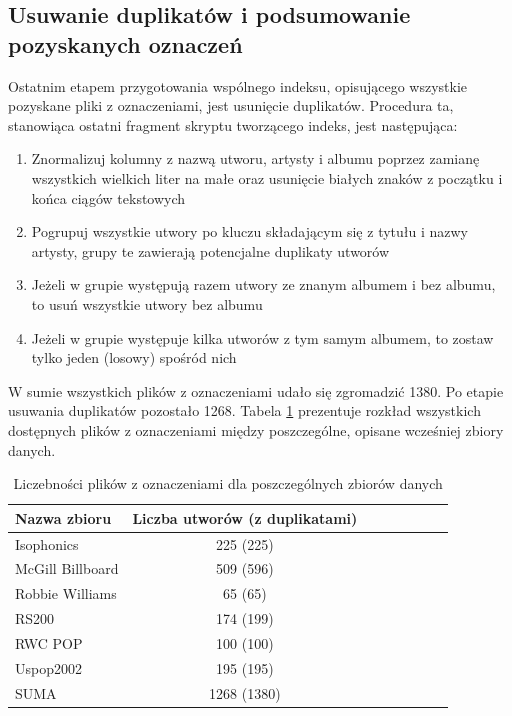\subsection{Usuwanie duplikatów i podsumowanie pozyskanych oznaczeń}

Ostatnim etapem przygotowania wspólnego indeksu, opisującego wszystkie pozyskane pliki z
oznaczeniami, jest usunięcie duplikatów. Procedura ta, stanowiąca ostatni fragment skryptu
tworzącego indeks, jest następująca:

\begin{enumerate}
    \item Znormalizuj kolumny z nazwą utworu, artysty i albumu poprzez zamianę wszystkich wielkich
        liter na małe oraz usunięcie białych znaków z początku i końca ciągów tekstowych
    \item Pogrupuj wszystkie utwory po kluczu składającym się z tytułu i nazwy artysty, grupy te
        zawierają potencjalne duplikaty utworów
    \item Jeżeli w grupie występują razem utwory ze znanym albumem i bez albumu, to usuń wszystkie
        utwory bez albumu
    \item Jeżeli w grupie występuje kilka utworów z tym samym albumem, to zostaw tylko jeden
        (losowy) spośród nich
\end{enumerate}

W sumie wszystkich plików z oznaczeniami udało się zgromadzić 1380. Po etapie usuwania duplikatów
pozostało 1268. Tabela \ref{tab:datasets1} prezentuje rozkład wszystkich dostępnych plików z
oznaczeniami między poszczególne, opisane wcześniej zbiory danych.

\begin{table}
    \centering
    \caption{Liczebności plików z oznaczeniami dla poszczególnych zbiorów danych}
    \label{tab:datasets1}
    \begin{tabular}{|l|c|c|c|c|c|c|c|} \hline
        Nazwa zbioru & Liczba utworów (z duplikatami) \\ \hline
        Isophonics & 225 (225) \\
        McGill Billboard & 509 (596) \\
        Robbie Williams & 65 (65) \\
        RS200 & 174 (199) \\
        RWC POP & 100 (100) \\
        Uspop2002 & 195 (195) \\
        SUMA & 1268 (1380) \\ \hline
    \end{tabular}
\end{table}


